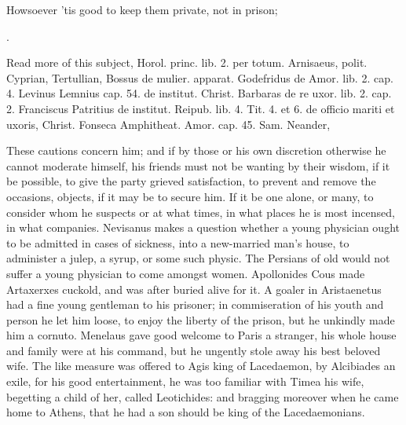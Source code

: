 Howsoever 'tis good to keep them private, not in prison;

.

Read more of this subject, Horol. princ. lib. 2. per totum. Arnisaeus,
polit. Cyprian, Tertullian, Bossus de mulier. apparat. Godefridus de
Amor. lib. 2. cap. 4. Levinus Lemnius cap. 54. de institut. Christ.
Barbaras de re uxor. lib. 2. cap. 2. Franciscus Patritius de institut.
Reipub. lib. 4. Tit. 4. et 6. de officio mariti et uxoris, Christ.
Fonseca Amphitheat. Amor. cap. 45. Sam. Neander, \etc{}

These cautions concern him; and if by those or his own discretion
otherwise he cannot moderate himself, his friends must not be wanting
by their wisdom, if it be possible, to give the party grieved
satisfaction, to prevent and remove the occasions, objects, if it may
be to secure him. If it be one alone, or many, to consider whom he
suspects or at what times, in what places he is most incensed, in what
companies. Nevisanus makes a question whether a young physician
ought to be admitted in cases of sickness, into a new-married man's
house, to administer a julep, a syrup, or some such physic. The
Persians of old would not suffer a young physician to come amongst
women. Apollonides Cous made Artaxerxes cuckold, and was after
buried alive for it. A goaler in Aristaenetus had a fine young
gentleman to his prisoner; in commiseration of his youth and
person he let him loose, to enjoy the liberty of the prison, but he
unkindly made him a cornuto. Menelaus gave good welcome to Paris a
stranger, his whole house and family were at his command, but he
ungently stole away his best beloved wife. The like measure was offered
to Agis king of Lacedaemon, by  Alcibiades an exile, for his good
entertainment, he was too familiar with Timea his wife, begetting a
child of her, called Leotichides: and bragging moreover when he came
home to Athens, that he had a son should be king of the Lacedaemonians.

